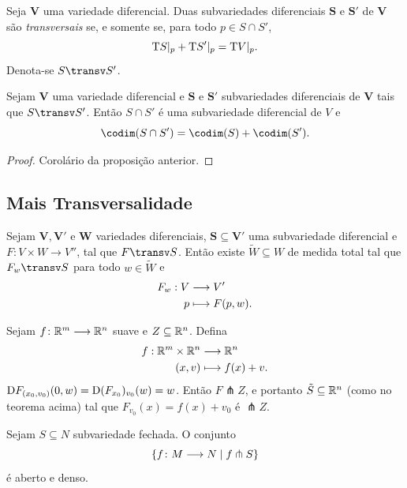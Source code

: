 \begin{defi}
Seja $\bm V$ uma variedade diferencial. Duas subvariedades diferenciais $\bm S$ e $\bm S'$ de $\bm V$ são \emph{transversais} se, e somente se, para todo $p \in S \cap S'$,
	\begin{equation*}
	\mathrm{T} S|_p + \mathrm{T} S'|_{p} = \mathrm{T} V|_{p}.
	\end{equation*}
Denota-se $S \transv S'$.
\end{defi}

\begin{prop}
Sejam $\bm V$ uma variedade diferencial e $\bm S$ e $\bm S'$ subvariedades diferenciais de $\bm V$ tais que $S \transv S'$. Então $S \cap S'$ é uma subvariedade diferencial de $V$ e
	\begin{equation*}
	\codim(S \cap S') = \codim(S) + \codim(S').
	\end{equation*}
\end{prop}
\begin{proof}
Corolário da proposição anterior.
\end{proof}

\subsection{Mais Transversalidade}

\begin{prop}
Sejam $\bm V,\bm V'$ e $\bm W$ variedades diferenciais, $\bm S \subseteq \bm V'$ uma subvariedade diferencial e $F\colon V \times W \to V''$, tal que $F \transv S$. Então existe $\tilde{W} \subseteq W$ de medida total tal que $F_w \transv S$ para todo $w \in \tilde{W}$ e
	\begin{align*}
	{F_w}: {V} &\longrightarrow {V'} \\{p} &\longmapsto {F(p,w)}.
	\end{align*}
\end{prop}

\begin{ex}Sejam $f\colon \mathbb{R}^m \longrightarrow \mathbb{R}^n$ suave e $Z \subseteq \mathbb{R}^n$. Defina
	\begin{align*}
	{f}: {\mathbb{R}^m \times \mathbb{R}^n} &\longrightarrow {\mathbb{R}^n} \\{(x,v)} &\longmapsto {f(x)+v}.
	\end{align*}
$\mathrm{D} F_{(x_0,v_0)}(0,w)=\mathrm{D} (F_{x_0})_{v_0}(w) = w$. Então $F \pitchfork Z$, e portanto $\tilde{S}\subseteq \mathbb{R}^n$ (como no teorema acima) tal que $F_{v_0}(x)=f(x)+v_0$ é $\pitchfork Z$.
\end{ex}

\begin{prop}
Sejam $S \subseteq N$ subvariedade fechada. O conjunto
	\begin{equation*}
	\left\{f\colon M \longrightarrow N \;\middle\vert\; f \pitchfork S \right\}
	\end{equation*}
é aberto e denso.
\end{prop}








